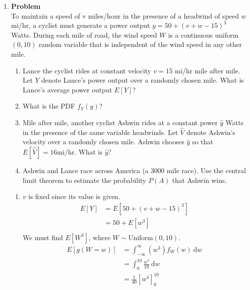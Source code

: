 \documentclass[12pt]{article}
\newenvironment{Ex}{\textbf{Problem}\vspace{.75em}\\}{}
\newcommand{\dd}[1]{\:\mathrm{d}{#1}}
\begin{document}
\begin{enumerate}
\item
  \begin{Ex}
    To maintain a speed of v miles/hour in the presence of a headwind
    of speed $w$ mi/hr, a cyclist must generate a power output $y = 50
    + (v + w - 15)^3$ Watts. During each mile of road, the wind speed
    $W$ is a continuous uniform $(0,10)$ random variable that is
    independent of the wind speed in any other mile.
    \begin{enumerate}
    \item Lance the cyclist rides at constant velocity $v = 15$ mi/hr
      mile after mile. Let $Y$ denote Lance's power output over a
      randomly chosen mile. What is Lance's average power output
      $E[Y]$?
    \item What is the PDF $f_Y (y)$?
    \item Mile after mile, another cyclist Ashwin rides at a constant
      power $\hat{y}$ Watts in the presence of the same variable
      headwinds. Let $\hat{V}$ denote Ashwin's velocity over a
      randomly chosen mile. Ashwin chooses $\hat{y}$ so that
      $E[\hat{V}] = 16 \text{mi/hr}$. What is $\hat{y}$?
    \item Ashwin and Lance race across America (a 3000 mile race). Use
      the central limit theorem to estimate the probability $P(A)$
      that Ashwin wins.
    \end{enumerate}
    \begin{solution} \hfill
      \begin{enumerate}
      \item $v$ is fixed since its value is given.
        \begin{equation}
          \label{eq:4a-presol}
          \begin{aligned}
            E[Y] &= E[50 + (v+w-15)^3] \\
            &= 50 + E[w^3] \\
          \end{aligned}
        \end{equation}
        We must find $E[W^3]$, where $W\sim\text{Uniform}(0,10)$.
        \begin{equation}
          \label{eq:4a-w-cubed}
          \begin{aligned}
            E[g(W=w)] &= \int_{-\infty}^{\infty} (w^3)f_W(w) \dd{w} \\
            &= \int_{0}^{10}\frac{w^3}{10} \dd{w} \\
            &= \frac{1}{40} [w^4]_{0}^{10} \\

\end{aligned}
\end{equation}
\end{enumerate}
\end{solution}
\end{Ex}
\end{enumerate}
\end{document}
